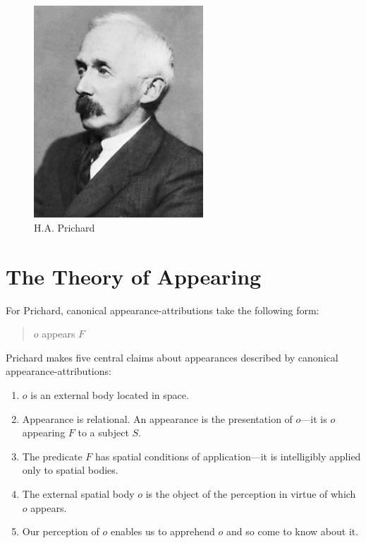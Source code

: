 \documentclass[11pt]{article}
\title{\mytitle\\
\mysubtitle}
\author{\myauthor}
\date{} %
\begin{document}
\maketitle

\setlength{\parindent}{1em}


\begin{figure}[htbp]
    \centering
        \includegraphics[scale=1]{../../graphics/prichard.jpg}
    \caption{H.A. Prichard}
    \label{fig:prichard}
\end{figure}

\section{The Theory of Appearing} %
\label{sec:the_theory_of_appearing}
For Prichard, canonical appearance-attributions take the following form:
    \begin{quote}
        \( o \) appears \( F \)
    \end{quote}
Prichard makes five central claims about appearances described by canonical appearance-attributions:
    \begin{enumerate}
        \item \( o \) is an external body located in space.
        \item Appearance is relational. An appearance is the presentation of \( o \)---it is \( o \) appearing \( F \) to a subject \( S \).
        \item The predicate \( F \) has spatial conditions of application---it is intelligibly applied only to spatial bodies.
        \item The external spatial body \( o \) is the object of the perception in virtue of which \( o \) appears.
        \item Our perception of \( o \) enables us to apprehend \( o \) and so come to know about it.
    \end{enumerate}
\end{document}
